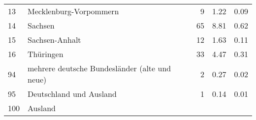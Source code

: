 \begin{longtable}{lXrrr}
     13 &
     \multicolumn{1}{X}{ Mecklenburg-Vorpommern   } &


       \num{9} &
       \num[round-mode=places,round-precision=2]{1,22} &
         \num[round-mode=places,round-precision=2]{0,09} \\

     14 &
     \multicolumn{1}{X}{ Sachsen   } &


       \num{65} &
       \num[round-mode=places,round-precision=2]{8,81} &
         \num[round-mode=places,round-precision=2]{0,62} \\

     15 &
     \multicolumn{1}{X}{ Sachsen-Anhalt   } &


       \num{12} &
       \num[round-mode=places,round-precision=2]{1,63} &
         \num[round-mode=places,round-precision=2]{0,11} \\

     16 &
     \multicolumn{1}{X}{ Thüringen   } &


       \num{33} &
       \num[round-mode=places,round-precision=2]{4,47} &
         \num[round-mode=places,round-precision=2]{0,31} \\

     94 &
     \multicolumn{1}{X}{ mehrere deutsche Bundesländer (alte und neue)   } &


       \num{2} &
       \num[round-mode=places,round-precision=2]{0,27} &
         \num[round-mode=places,round-precision=2]{0,02} \\

     95 &
     \multicolumn{1}{X}{ Deutschland und Ausland   } &


       \num{1} &
       \num[round-mode=places,round-precision=2]{0,14} &
         \num[round-mode=places,round-precision=2]{0,01} \\

     100 &
     \multicolumn{1}{X}{ Ausland   } &



\end{longtable}
